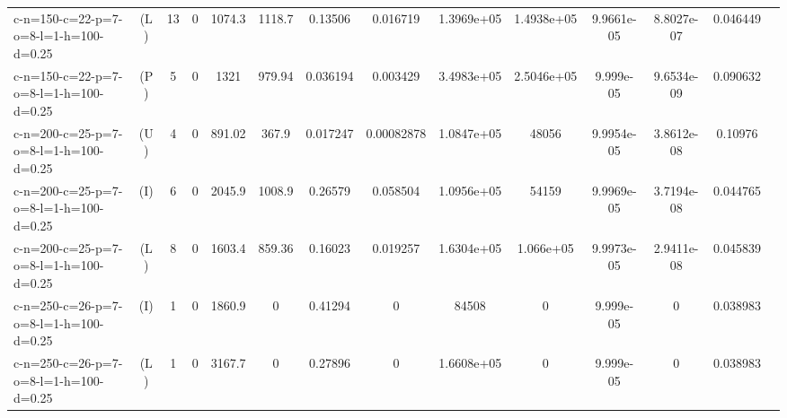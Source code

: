 \documentclass[landscape, a4paper]{article}
\newcommand{\Improved}{\ensuremath{\mathrm{I}}}
\newcommand{\Loose}{\ensuremath{\mathrm{L}}}
\newcommand{\Profit}{\ensuremath{\mathrm{P}}}
\newcommand{\Utility}{\ensuremath{\mathrm{U}}}
\begin{document}
\begin{center}
\begin{tabular}{lccccccccccccc}
c-n=150-c=22-p=7-o=8-l=1-h=100-d=0.25 & (\Loose) & 13 & 0 & 1074.3 & 1118.7 & 0.13506 & 0.016719 & 1.3969e+05 & 1.4938e+05 & 9.9661e-05 & 8.8027e-07 & 0.046449 & \\
c-n=150-c=22-p=7-o=8-l=1-h=100-d=0.25 & (\Profit) & 5 & 0 & 1321 & 979.94 & 0.036194 & 0.003429 & 3.4983e+05 & 2.5046e+05 & 9.999e-05 & 9.6534e-09 & 0.090632 & \\
c-n=200-c=25-p=7-o=8-l=1-h=100-d=0.25 & (\Utility) & 4 & 0 & 891.02 & 367.9 & 0.017247 & 0.00082878 & 1.0847e+05 & 48056 & 9.9954e-05 & 3.8612e-08 & 0.10976 & \\
c-n=200-c=25-p=7-o=8-l=1-h=100-d=0.25 & (\Improved) & 6 & 0 & 2045.9 & 1008.9 & 0.26579 & 0.058504 & 1.0956e+05 & 54159 & 9.9969e-05 & 3.7194e-08 & 0.044765 & \\
c-n=200-c=25-p=7-o=8-l=1-h=100-d=0.25 & (\Loose) & 8 & 0 & 1603.4 & 859.36 & 0.16023 & 0.019257 & 1.6304e+05 & 1.066e+05 & 9.9973e-05 & 2.9411e-08 & 0.045839 & \\
c-n=250-c=26-p=7-o=8-l=1-h=100-d=0.25 & (\Improved) & 1 & 0 & 1860.9 & 0 & 0.41294 & 0 & 84508 & 0 & 9.999e-05 & 0 & 0.038983 & \\
c-n=250-c=26-p=7-o=8-l=1-h=100-d=0.25 & (\Loose) & 1 & 0 & 3167.7 & 0 & 0.27896 & 0 & 1.6608e+05 & 0 & 9.999e-05 & 0 & 0.038983 & \\
\end{tabular}
\end{center}
\end{document}
